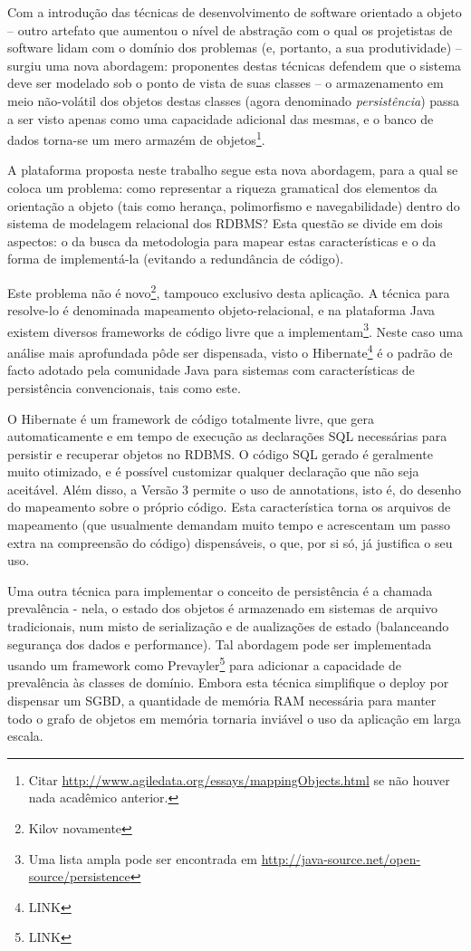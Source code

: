 \documentclass{abnt}
\begin{document}
Com a introdução das técnicas de desenvolvimento de software orientado a objeto – outro artefato que aumentou o nível de abstração com o qual os projetistas de software lidam com o domínio dos problemas (e, portanto, a sua produtividade) – surgiu uma nova abordagem: proponentes destas técnicas defendem que o sistema deve ser modelado sob o ponto de vista de suas classes – o armazenamento em meio não-volátil dos objetos destas classes (agora denominado \textit{persistência}) passa a ser visto apenas como uma capacidade adicional das mesmas, e o banco de dados torna-se um mero armazém de objetos\footnote{Citar \url{http://www.agiledata.org/essays/mappingObjects.html} se não houver nada acadêmico anterior.}.

A plataforma proposta neste trabalho segue esta nova abordagem, para a qual se coloca um problema: como representar a riqueza gramatical dos elementos da orientação a objeto (tais como herança, polimorfismo e navegabilidade) dentro do sistema de modelagem relacional dos RDBMS? Esta questão se divide em dois aspectos: o da busca da metodologia para mapear estas características e o da forma de implementá-la (evitando a redundância de código).

Este problema não é novo\footnote{Kilov novamente}, tampouco exclusivo desta aplicação. A técnica para resolve-lo é denominada mapeamento objeto-relacional, e na plataforma Java existem diversos frameworks de código livre que a implementam\footnote{Uma lista ampla pode ser encontrada em \url{http://java-source.net/open-source/persistence}}. Neste caso uma análise mais aprofundada pôde ser dispensada, visto o Hibernate\footnote{LINK} é o padrão de facto adotado pela comunidade Java para sistemas com características de persistência convencionais, tais como este.

O Hibernate é um framework de código totalmente livre, que gera automaticamente e em tempo de execução as declarações SQL necessárias para persistir e recuperar objetos no RDBMS. O código SQL gerado é geralmente muito otimizado, e é possível customizar qualquer declaração que não seja aceitável. Além disso, a Versão 3 permite o uso de annotations, isto é, do desenho do mapeamento sobre o próprio código. Esta característica torna os arquivos de mapeamento (que usualmente demandam muito tempo e acrescentam um passo extra na compreensão do código) dispensáveis, o que, por si só, já justifica o seu uso.

Uma outra técnica para implementar o conceito de persistência é a chamada prevalência - nela, o estado dos objetos é armazenado em sistemas de arquivo tradicionais, num misto de serialização e de aualizações de estado (balanceando segurança dos dados e performance). Tal abordagem pode ser implementada usando um framework como Prevayler\footnote{LINK} para adicionar a capacidade de prevalência às classes de domínio. Embora esta técnica simplifique o deploy por dispensar um SGBD, a quantidade de memória RAM necessária para manter todo o grafo de objetos em memória tornaria inviável o uso da aplicação em larga escala.
\end{document}
